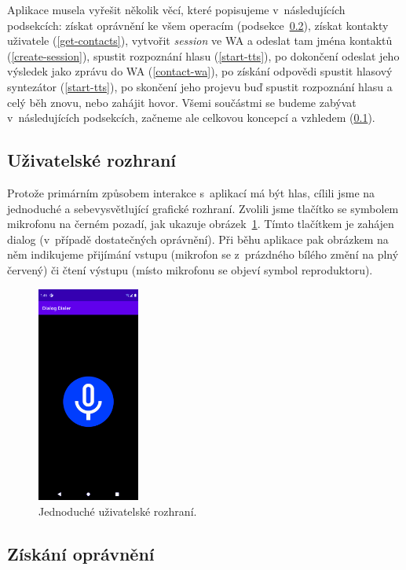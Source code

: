Aplikace musela vyřešit několik věcí, které popisujeme
v~následujících podsekcích: získat oprávnění ke všem operacím (podsekce~\ref{get-permissions}),
získat kontakty uživatele (\ref{get-contacts}), vytvořit \textit{session} ve WA a odeslat
tam jména kontaktů (\ref{create-session}), spustit rozpoznání hlasu (\ref{start-tts}), po dokončení odeslat jeho výsledek
jako zprávu do WA (\ref{contact-wa}), po získání odpovědi spustit hlasový syntezátor (\ref{start-tts}), po skončení
jeho projevu buď spustit rozpoznání hlasu a celý běh znovu, nebo zahájit
hovor. Všemi součástmi se budeme zabývat v~následujících podsekcích, začneme
ale celkovou koncepcí a vzhledem (\ref{desc-ui}).

\subsection{Uživatelské rozhraní}\label{desc-ui}

Protože primárním způsobem interakce
s~aplikací má být hlas, cílili jsme na jednoduché a sebevysvětlující grafické
rozhraní. Zvolili jsme tlačítko se symbolem mikrofonu na černém pozadí,
jak ukazuje obrázek~\ref{img-ui}. Tímto tlačítkem je zahájen dialog (v~případě
dostatečných oprávnění). Při běhu aplikace
pak obrázkem na něm indikujeme přijímání vstupu (mikrofon se z~prázdného bílého
změní na plný červený) či čtení výstupu (místo mikrofonu se objeví symbol reproduktoru).

\begin{figure}[h]
    \centering
    \includegraphics[width=0.3\textwidth]{../img/ui.pdf}
    \caption{Jednoduché uživatelské rozhraní.}
    \label{img-ui}
\end{figure}

\subsection{Získání oprávnění}\label{get-permissions}

